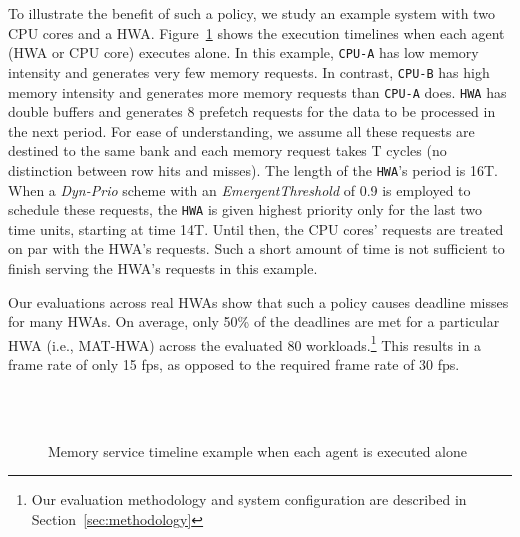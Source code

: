 \documentclass[10pt,letterpaper]{article}
\newcommand{\ca}[0]{\texttt{CPU-A}\xspace}
\newcommand{\cb}[0]{\texttt{CPU-B}\xspace}
\newcommand{\hwa}[0]{\texttt{HWA}\xspace}
\newif\ifSQUEEZE
\begin{document}
To illustrate the benefit of such a policy, we study an example system
with two CPU cores and a HWA. Figure~\ref{fig:singlemaster} shows the execution
timelines when each agent (HWA or
CPU core) executes alone. In this example, \ca has low memory intensity and
generates very few memory requests. In contrast, \cb has high memory intensity
and generates more memory requests than \ca does. \hwa has double buffers and
generates 8 prefetch requests for the data to be processed in the next period.
For ease of understanding, we assume all these requests are destined to the
same bank and each memory request takes T cycles (no distinction between row
hits and misses). The length of the \hwa's period is 16T. When a
\emph{Dyn-Prio} scheme with an \emph{EmergentThreshold} of 0.9 is employed to
schedule these requests, the \hwa is given highest priority only for the last
two time units, starting at time 14T. Until then, the CPU cores' requests are
treated on par with the HWA's requests. Such a short amount of time is not
sufficient to finish serving the HWA's requests in this example. 
\ifSQUEEZE
\else
Our evaluations
across real HWAs show that such a policy causes deadline misses for many HWAs. On average, only
50\% of the deadlines are met for a particular HWA (i.e., MAT-HWA) across the
evaluated 80 workloads.\footnote{Our evaluation methodology and system
configuration are described in Section~\ref{sec:methodology}} This results in
a frame rate of only 15 fps, as opposed to the required frame rate of 30 fps.
\fi



\captionsetup[subfloat]{captionskip=-0.5pt}
\captionsetup[subfloat]{nearskip=-0.5pt}


\begin{figure}[t]
  \centering
  \vspace{-2mm}
  \\
  \vspace{-2mm}
  \\
  \caption{Memory service timeline example when each agent is executed alone}
  \label{fig:singlemaster}
\end{figure}
\end{document}
